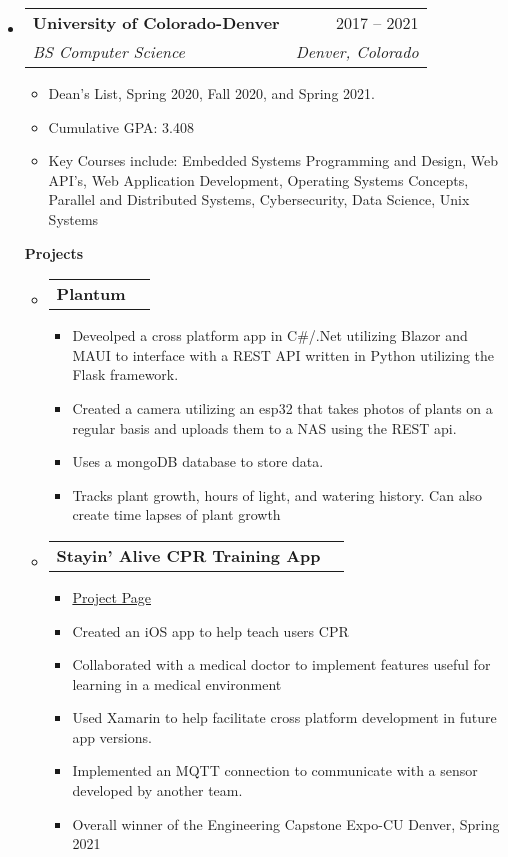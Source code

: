 \documentclass[letterpaper,12pt]{article}[leftmargin=*]
\makeatletter
\def \entryspacing {-0pt}
\renewcommand{\section}[2]{\vspace{5pt}
  \colorbox{secondary}{\color{white}\raggedbottom\normalsize\textbf{{#1}{\hspace{7pt}#2}}}
}
\newcommand{\resumeEntryStart}{\begin{itemize}[leftmargin=2.5mm]}
\newcommand{\resumeEntryEnd}{\end{itemize}\vspace{\entryspacing}}
\newcommand{\resumeItemListStart}{\begin{itemize}[leftmargin=4.5mm]}
\newcommand{\resumeItemListEnd}{\end{itemize}}
\newcommand{\resumeItem}[1]{
  \item\small{
    {#1 \vspace{-2pt}}
  }
}
\newcommand{\resumeEntryTSDL}[4]{
  \vspace{-1pt}\item[]
    \begin{tabularx}{0.97\textwidth}{X@{\hspace{60pt}}r}
      \textbf{\color{primary}#1} & {\firabook\color{accent}\small#2} \\
      \textit{\color{accent}\small#3} & \textit{\color{accent}\small#4} \\
    \end{tabularx}\vspace{-6pt}
}
\newcommand{\resumeEntryTD}[2]{
  \vspace{-1pt}\item[]
    \begin{tabularx}{0.97\textwidth}{X@{\hspace{60pt}}r}
      \textbf{\color{primary}#1} & {\firabook\color{accent}\small#2} \\
    \end{tabularx}\vspace{-6pt}
}
\makeatother
\begin{document}
  \resumeEntryStart
     \resumeEntryTSDL
      {University of Colorado-Denver}{2017 -- 2021}
    {BS Computer Science}{Denver, Colorado}
 \begin{itemize}
  \resumeItem{Dean's List, Spring 2020, Fall 2020, and Spring 2021.}
  \resumeItem{Cumulative GPA: 3.408}
  \resumeItem{Key Courses include: Embedded Systems Programming and Design, Web API's, Web Application Development, Operating Systems Concepts, Parallel and Distributed Systems, Cybersecurity, Data Science, Unix Systems}
 
  

    \resumeEntryEnd



\section{\faFlask}{Projects}
\resumeEntryStart
\resumeEntryTD{Plantum}{}
 \resumeItemListStart
    \resumeItem{Deveolped a cross platform app in C\#/.Net utilizing Blazor and MAUI to interface with a REST API written in Python utilizing the Flask framework.}
    \resumeItem{Created a camera utilizing an esp32 that takes photos of plants on a regular basis and uploads them to a NAS using the REST api.}
    \resumeItem{Uses a mongoDB database to store data.}
    \resumeItem{Tracks plant growth, hours of light, and watering history. Can also create time lapses of plant growth}
 \resumeItemListEnd
\resumeEntryEnd
  \resumeEntryStart
    \resumeEntryTD
      {Stayin' Alive CPR Training App}{}
      
    \resumeItemListStart
      \resumeItem {\href{https://engineering.ucdenver.edu/current-students/capstone-expo/sp21/csci10}{Project Page}}
      \resumeItem {Created an iOS app to help teach users CPR}
      \resumeItem {Collaborated with a medical doctor to implement features useful for learning in a medical environment}
      \resumeItem {Used Xamarin to help facilitate cross platform development in future app versions.}
      \resumeItem {Implemented an MQTT connection to communicate with a sensor developed by another team. }
      \resumeItem {Overall winner of the Engineering Capstone Expo-CU Denver, Spring 2021}
    \resumeItemListEnd
  \resumeEntryEnd



\end{itemize}
\end{document}
